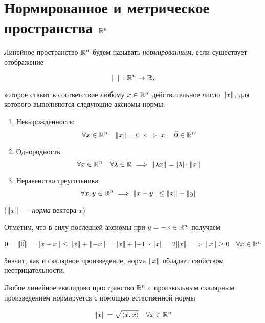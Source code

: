 \documentclass[../../main.tex]{subfiles}
\begin{document}
\section{Нормированное и метрическое пространства $\mathbb{R}^n$}

Линейное пространство $\mathbb{R}^n$ будем называть 
\textit{нормированным}, если существует отображение

\begin{equation}
 \label{norm-disp}
 \lVert\ \rVert: \mathbb{R}^n \to \mathbb{R},
\end{equation}

которое ставит в соответствие любому $x \in \mathbb{R}^n$ действительное 
число $\lVert{x}\rVert$, для которого выполняются следующие аксиомы нормы:

\begin{enumerate}
 \item Невырожденность:
 \[\forall x \in \mathbb{R}^n \quad \lVert{x}\rVert = 0 \iff x = \vec 0 \in \mathbb{R}^n\]
 \item Однородность:
 \[\forall x \in \mathbb{R}^n \quad \forall \lambda \in \mathbb{R} \implies 
   \lVert{\lambda x}\rVert = \left|{\lambda}\right| \cdot \lVert{x}\rVert\]
 \item Неравенство треугольника:
 \[\forall x, y \in \mathbb{R}^n \implies \lVert{x+y}\rVert \le \lVert{x}\rVert + \lVert{y}\rVert\]
\end{enumerate}

($\lVert{x}\rVert$~--- \textit{норма} вектора $x$)

\bigskip

Отметим, что в силу последней аксиомы при $y = -x \in \mathbb{R}^n$ получаем

$0 = \lVert{\vec 0}\rVert = \lVert{x - x}\rVert \le \lVert{x}\rVert + \lVert{-x}\rVert =
 \lVert{x}\rVert + \left|{-1}\right| \cdot \lVert{x}\rVert = 2\lVert{x}\rVert \implies \lVert{x}\rVert \ge 0
 \quad \forall x \in \mathbb{R}^n$
 
Значит, как и скалярное произведение, норма $\lVert{x}\rVert$ обладает
свойством неотрицательности.

\begin{thm}
 Любое линейное евклидово пространство $\mathbb{R}^n$ с произвольным скалярным
 произведением нормируется с помощью естественной нормы
 
 \begin{equation}
  \label{rn-norm}
  \lVert{x}\rVert = \sqrt{\left<x, x\right>} \quad \forall x \in \mathbb{R}^n
 \end{equation}
 
\end{thm}
\end{document}
